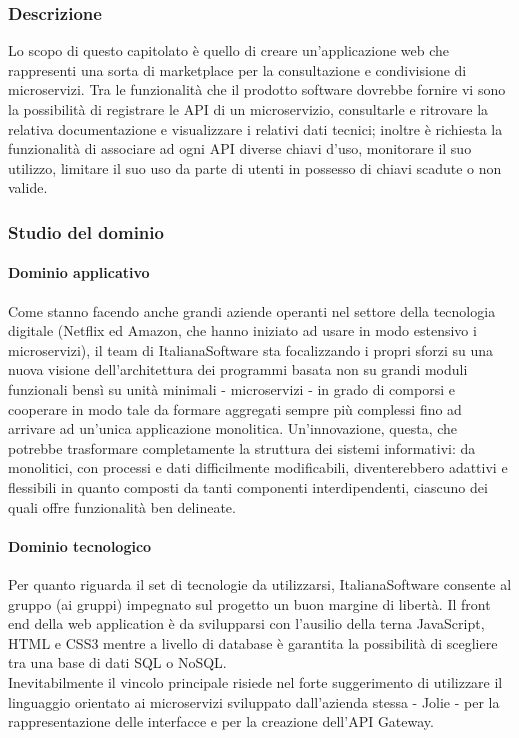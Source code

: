 		\subsubsection{Descrizione}
		Lo scopo di questo capitolato è quello di creare un'applicazione web che rappresenti una sorta di marketplace per la consultazione e 
		condivisione di microservizi. Tra le funzionalità che il prodotto software dovrebbe fornire vi sono la possibilità di registrare le API 
		di un microservizio, consultarle e ritrovare la relativa documentazione e visualizzare i relativi dati tecnici; inoltre è richiesta la 
		funzionalità di associare ad ogni API diverse chiavi d'uso, monitorare il suo utilizzo, limitare il suo uso da parte di utenti in possesso 
		di chiavi scadute o non valide.
		\subsubsection{Studio del dominio}
			\paragraph{Dominio applicativo}
			Come stanno facendo anche grandi aziende operanti nel settore della tecnologia digitale (Netflix ed Amazon, che hanno iniziato ad usare 
			in modo estensivo i microservizi), il team di ItalianaSoftware sta focalizzando i propri sforzi su una nuova visione dell'architettura 
			dei programmi basata non su grandi moduli funzionali bensì su unità minimali - microservizi - in grado di comporsi e cooperare in modo 
			tale da formare aggregati sempre più complessi fino ad arrivare ad un'unica applicazione monolitica. Un'innovazione, questa, che potrebbe 
			trasformare completamente la struttura dei sistemi informativi: da monolitici, con processi e dati difficilmente modificabili, diventerebbero 
			adattivi e flessibili in quanto composti da tanti componenti interdipendenti, ciascuno dei quali offre funzionalità ben delineate.
			\paragraph{Dominio tecnologico}
			Per quanto riguarda il set di tecnologie da utilizzarsi, ItalianaSoftware consente al gruppo (ai gruppi) impegnato sul progetto un buon 
			margine di libertà. Il front end della web application è da svilupparsi con l'ausilio della terna JavaScript, HTML e CSS3 mentre a 
			livello di database è garantita la possibilità di scegliere tra una base di dati SQL o NoSQL.\\
			Inevitabilmente il vincolo principale risiede nel forte suggerimento di utilizzare il linguaggio orientato ai microservizi sviluppato 
			dall'azienda stessa - Jolie - per la rappresentazione delle interfacce e per la creazione dell'API Gateway.
